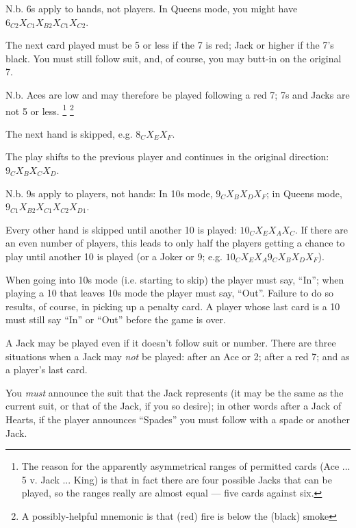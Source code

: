 \documentclass[12pt]{article}
\begin{document}
\begin{description}
    N.b. 6s apply to hands, not players.  In Queens mode, you might have $6_{C2} X_{C1} X_{B2} X_{C1} X_{C2}$.

  \item[\card{7}] The next card played must be 5 or less if the 7 is red; Jack or higher if the 7's black. You
    must still follow suit, and, of course, you may butt-in on the original 7.
    
    N.b. Aces are low and may therefore be played following a red 7; 7s and Jacks are not 5 or less.%
    \footnote{The reason for the apparently asymmetrical ranges of permitted cards (Ace ... 5 v. Jack ... King)
    is that in fact there are four possible Jacks that can be played, so the ranges really are almost
    equal --- five cards against six.}
    \footnote{A possibly-helpful mnemonic is that (red) fire is below the (black) smoke}

  \item[\card{8}]
    The next hand is skipped, e.g. $8_C X_E X_F$.

  \item[\card{9}]
    The play shifts to the previous player and continues in the original direction: $9_C X_B X_C X_D$.

    N.b. 9s apply to players, not hands: In 10s mode, $9_C X_B X_D X_F$;
    in Queens mode, $9_{C1} X_{B2} X_{C1} X_{C2} X_{D1}$.

  \item[\card{10}]
    Every other hand is skipped until another 10 is played: $10_C X_E X_A X_C$.  If there are an even number of
    players, this leads to only half the players getting a chance to play until another
    10 is played (or a Joker or 9; e.g.  $10_C X_E X_A 9_C X_B X_D X_F$).

    When going into 10s mode (i.e. starting to skip) the player must say, ``In''; when playing a
    10 that leaves 10s mode the player must say, ``Out''.  Failure to do so results, of course,
    in picking up a penalty card.  A player whose last card is a 10 must still say ``In'' or ``Out''
    before the game is over.

  \item[\card{Jack}]
    A Jack may be played even if it doesn't follow suit or number.  There are three situations
    when a Jack may \emph{not} be played:  after an Ace or 2; after a red 7; and as a player's last card.

    You \emph{must} announce the suit that the Jack represents (it may be the same as the
    current suit, or that of the Jack, if you so desire);  in other words after a Jack of
    Hearts, if the player announces ``Spades'' you must follow with a spade or another Jack.


\end{description}
\end{document}
